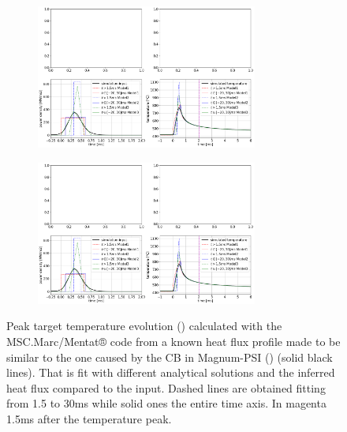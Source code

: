 \begin{figure}[!ht]
     \centering
     \begin{subfigure}{0.7\linewidth}
         \centering
        \hspace*{-5mm}
         \includegraphics[width=0.8\textwidth,trim={510 5 5 330},clip]{Chapters/chapter3/figs/Figure_3.png}
         \caption{\phantom{wew}}
         \label{fig:IR7a}
     \end{subfigure}
     \hfill
     \begin{subfigure}{0.7\linewidth}
         \centering
         \includegraphics[width=0.8\textwidth,trim={5 5 515 330},clip]{Chapters/chapter3/figs/Figure_3.png}
         \caption{\phantom{wew}}
         \label{fig:IR7b}
     \end{subfigure}
        \caption{Peak target temperature evolution () calculated with the MSC.Marc/Mentat® code from a known heat flux profile made to be similar to the one caused by the CB in Magnum-PSI () (solid black lines). That is fit with different analytical solutions and the inferred heat flux compared to the input. Dashed lines are obtained fitting from 1.5 to 30ms while solid ones the entire time axis. In magenta 1.5ms after the temperature peak.}
        \label{fig:IR7}
\end{figure}

